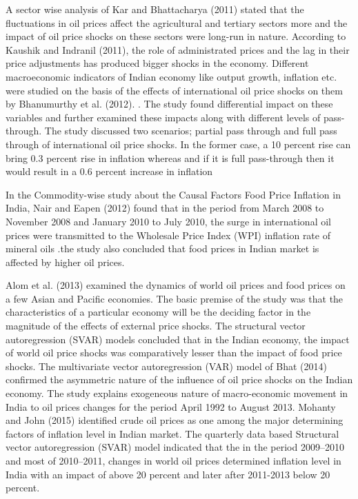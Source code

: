 \documentclass[a4paper,12pt]{article}
\begin{document}
A sector wise analysis of Kar and Bhattacharya (2011) stated that the fluctuations in oil prices affect the agricultural and tertiary sectors more and the impact of oil price shocks on these sectors were long-run in nature. According to Kaushik and Indranil (2011), the role of administrated prices and the lag in their price adjustments has produced bigger shocks in the economy.
Different macroeconomic indicators of Indian economy like output growth, inflation etc. were studied on the basis of the effects of international oil price shocks on them by Bhanumurthy et al. (2012).
. The study found differential impact on these variables and further examined these impacts along with different levels of pass-through. The study discussed two scenarios; partial pass through and full pass through of international oil price shocks. In the former case, a 10 percent rise can bring 0.3 percent rise in inflation whereas and if it is full pass-through then it would result in a 0.6 percent increase in inflation 

In the Commodity-wise study about the Causal Factors Food Price Inflation in India, Nair and Eapen (2012) found that in the period from March 2008 to November 2008 and January 2010 to July 2010, the surge in international oil prices were transmitted to the Wholesale Price Index (WPI) inflation rate of mineral oils .the study also concluded that food prices in Indian market is affected by higher oil prices.

Alom et al. (2013) examined the dynamics of world oil prices and food prices on a few Asian and Pacific economies. The basic premise of the study was that the characteristics of a particular economy will be the deciding factor in the magnitude of the effects of external price shocks. The structural vector autoregression (SVAR) models concluded that in the Indian economy, the impact of world oil price shocks was comparatively lesser than the impact of food price shocks. 
The multivariate vector autoregression (VAR) model of Bhat (2014) confirmed the asymmetric nature of the influence of oil price shocks on the Indian economy. The study explains exogeneous nature of macro-economic movement in India to oil prices changes for the period April 1992 to August 2013.
Mohanty and John (2015) identified crude oil prices as one among the major determining factors of inflation level in Indian market. The quarterly data based Structural vector autoregression (SVAR) model indicated that the in the period 2009–2010 and most of 2010–2011, changes in world oil prices determined inflation level in India with an impact of above 20 percent and later after 2011-2013 below 20 percent. 
\end{document}
